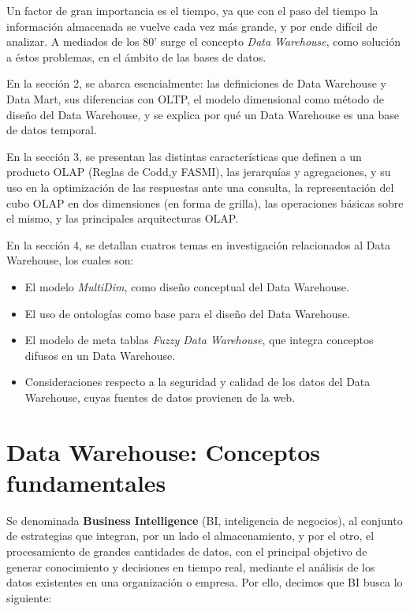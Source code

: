 \documentclass[a4paper,11pt]{article}
\begin{document}
    Un factor de gran importancia es el tiempo, ya que con el paso del tiempo la información almacenada se vuelve cada vez más grande,
    y por ende difícil de analizar. A mediados de los 80' surge el concepto \textit{Data Warehouse}, como solución a éstos problemas,
    en el ámbito de las bases de datos.
    
    En la sección 2, se abarca esencialmente: las definiciones de Data Warehouse y Data Mart, sus diferencias con OLTP, el modelo dimensional como
    método de diseño del Data Warehouse, y se explica por qué un Data Warehouse es una base de datos temporal.
    
    En la sección 3, se presentan las distintas características que definen a un producto OLAP (Reglas de Codd,y FASMI), las jerarquías y agregaciones, y
    su uso en la optimización de las respuestas ante una consulta, la representación del cubo OLAP en dos dimensiones (en forma de grilla), las operaciones
    básicas sobre el mismo, y las principales arquitecturas OLAP.
    
    En la sección 4, se detallan cuatros temas en investigación relacionados al Data Warehouse, los cuales son:
    \begin{itemize}
      \item El modelo \textit{MultiDim}, como diseño conceptual del Data Warehouse.
      \item El uso de ontologías como base para el diseño del Data Warehouse.
      \item El modelo de meta tablas \textit{Fuzzy Data Warehouse}, que integra conceptos difusos en un Data Warehouse.
      \item Consideraciones respecto a la seguridad y calidad de los datos del Data Warehouse, cuyas fuentes de datos provienen de la web.
    \end{itemize}
    


    \section{Data Warehouse: Conceptos fundamentales}
    
    Se denominada \textbf{Business Intelligence} (BI, inteligencia de negocios), al conjunto de estrategias que integran, por un lado el almacenamiento, y
    por el otro, el procesamiento de grandes cantidades de datos, con el principal objetivo de generar conocimiento y decisiones en tiempo real, mediante 
    el análisis de los datos existentes en una organización o empresa. Por ello, decimos que BI busca lo siguiente:
    
\end{document}
